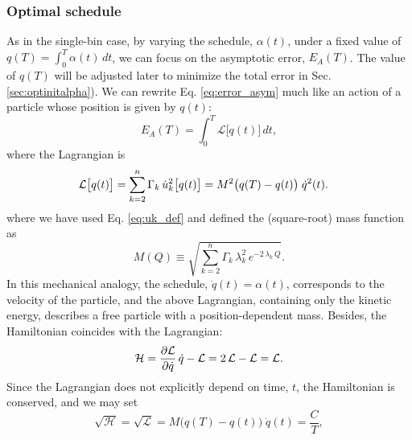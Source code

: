 \documentclass[reprint, superscriptaddress, floatfix]{revtex4-1}
\newcommand{\Err}{E}
\begin{document}
\subsubsection{\label{sec:optschedule}
Optimal schedule}



As in the single-bin case,
by varying the schedule, $\alpha(t)$, under a fixed value of
$q(T) = \int_0^T \alpha(t) \, dt$,
we can focus on the asymptotic error,
$\Err_A(T)$.
%
The value of $q(T)$ will be adjusted later
to minimize the total error in Sec. \ref{sec:optinitalpha}).
%
We can rewrite Eq. \eqref{eq:error_asym} much like an action
of a particle whose position is given by $q(t)$:
%
\begin{equation}
  \Err_A(T)
  =
  \int_0^T
    {\mathcal L} \bigl[ q(t)\bigr]
    \, dt
  ,
\label{eq:error_asym_Lagrangian}
\end{equation}
%
where the Lagrangian is
%
\begin{align}
  {\mathcal L} \bigl[ q(t) \bigr]
  &=
  \sum_{ k = 2 }^n
    \Gamma_k \, \dot u_k^2\bigl[ q(t) \bigr]
  =
  M^2\bigl(q(T) - q(t) \bigr)
  \; \dot q^2( t )
  .
\notag
\end{align}
%
where we have
used Eq. \eqref{eq:uk_def} and
defined the (square-root) mass function as
%
\begin{equation}
  M(Q)
  \equiv
  \sqrt{
    \textstyle\sum_{ k = 2 }^n \Gamma_k \, \lambda_k^2 \, e^{-2 \, \lambda_k \, Q}
  }
  .
\label{eq:mass_func}
\end{equation}
%
In this mechanical analogy,
the schedule, $\dot q(t) = \alpha(t)$,
corresponds to the velocity of the particle,
%
and the above Lagrangian, containing only the kinetic energy,
describes a free particle
with a position-dependent mass.
%
Besides, the Hamiltonian
coincides with the Lagrangian:
%
\begin{equation}
  \mathcal H
  =
  \frac{ \partial \mathcal L }
       { \partial \dot q     }
  \, \dot q
  -
  \mathcal L
  =
  2 \, \mathcal L
  - \mathcal L
  =
  \mathcal L
  .
  \notag
\end{equation}
%
Since the Lagrangian
does not explicitly depend on time, $t$,
the Hamiltonian is conserved,
and we may set
%
\begin{equation}
  \sqrt{ \mathcal H }
  =
  \sqrt{ \mathcal L }
  =
  M\bigl( q(T) - q(t) \bigr)
  \;
  \dot q(t)
  =
  \frac{C}{T}
  ,
  \label{eq:Lagrangian_const}
\end{equation}
\end{document}
